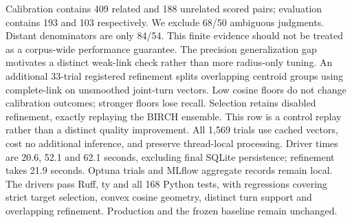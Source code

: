 Calibration contains 409 related and 188 unrelated scored pairs; evaluation
contains 193 and 103 respectively. We exclude 68/50 ambiguous judgments.
Distant denominators are only 84/54. This finite evidence should not be treated
as a corpus-wide performance guarantee. The precision generalization gap
motivates a distinct weak-link check rather than more radius-only tuning.
An additional 33-trial registered refinement splits overlapping centroid groups
using complete-link on unsmoothed joint-turn vectors. Low cosine floors do not
change calibration outcomes; stronger floors lose recall. Selection retains
disabled refinement, exactly replaying the BIRCH ensemble. This row is a control
replay rather than a distinct quality improvement.
All 1,569 trials use cached vectors, cost no additional inference, and preserve
thread-local processing. Driver times are 20.6, 52.1 and 62.1 seconds, excluding
final SQLite persistence; refinement takes 21.9 seconds. Optuna trials and MLflow
aggregate records remain local. The drivers pass Ruff, ty and all 168 Python tests, with
regressions covering strict target selection, convex cosine geometry, distinct
turn support and overlapping refinement. Production and the
frozen baseline remain unchanged.
